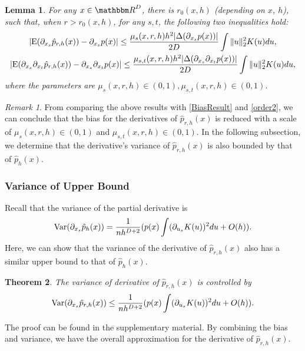 \documentclass[aos,preprint]{imsart}
\newtheorem{theorem}{Theorem}[section]
\newtheorem{lemma}[theorem]{Lemma}
\theoremstyle{remark}
\newtheorem*{remark}{Remark}
\begin{document}
\begin{lemma}\label{bias_theorem}
For any $x\in {\mathbbm R}^D$, there is $r_0(x,h)$ (depending on $x$, $h$), such that, when $r> r_0(x,h)$, for any $s, t$, the following two inequalities hold:
\begin{gather*}
|{\rm E} (\partial_ {x_s} \hat{p}_{r,h}(x)) -\partial_{x_s} p(x)| \leq  \frac{ \mu_s(x,r,h)h^2 |\Delta (\partial_{x_s}p(x))|}{2D} \int \|u\|_2^2 K(u) du,\\
|{\rm E} (\partial_{x_s} \partial_{x_t}  \hat{p}_{r, h}(x))-  \partial_{x_s} \partial_{x_t} p(x)| \leq   \frac{\mu_{s,t}(x,r,h)h^2|\Delta (\partial_{x_s}\partial_{x_t}p(x))|}{2D}  \int \|u\|_2^2 K(u) du,
\end{gather*}
where the parameters are $\mu_s(x,r,h)\in(0,1), \mu_{s,t}(x,r,h)\in(0,1)$.
\end{lemma}
\begin{remark}
From comparing the above results with \eqref{BiasResult} and \eqref{order2}, we can conclude that the bias for the derivatives of $\hat{p}_{r,h}(x)$ is reduced with a scale of $\mu_s(x,r,h)\in(0,1)$ and $\mu_{s,t}(x,r,h)\in(0,1)$. In the following subsection, we determine that the derivative's variance of $\hat{p}_{r,h}(x)$ is also bounded by that of $\hat{p}_h(x)$.
\end{remark}

\subsubsection{Variance of Upper Bound}
Recall that the variance of the partial derivative is
\[
{{\rm Var}}(\partial_{x_s} \hat{p}_h(x)) = \frac{1}{n h^{D+2}}  (p(x) \int (\partial_{ u_s } K (u) )^2  du + O(h)).
\] 
Here, we can show that the variance of the derivative of $\hat{p}_{r,h}(x)$ also has a similar upper bound to that of $\hat{p}_{h}(x)$.
\begin{theorem}{The variance of derivative of $\hat{p}_{r,h}(x)$ is controlled by}
\[
{{\rm Var}}(\partial_{x_s} \hat{p}_{r,h}(x)) \leq \frac{1}{n h^{D+2}}  (p(x) \int (\partial_{ u_s } K (u) )^2   du + O(h)).
\]
\end{theorem}
The proof can be found in the supplementary material.  %
By combining the bias and variance, we have the overall approximation for the derivative of $\hat{p}_{r,h}(x)$.
\end{document}
